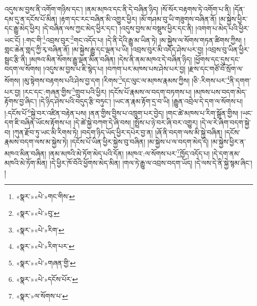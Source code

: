 འདུས་མ་བྱས་ནི་འགོག་གཉིས་དང་། །ནམ་མཁའ་དང་ནི་དེ་བཞིན་ཉིད། །སོ་སོར་བརྟགས་ཏེ་འགོག་པ་ནི། །དོན་དམ་དུ་ན་དངོས་པོ་མིན། །རྟག་དང་རང་བཞིན་མི་འགྱུར་ཕྱིར། །མོ་གཤམ་བུ་ཡི་གཟུགས་བཞིན་ནོ། །མ་སྐྱེས་ཕྱིར་དང་རྒྱུ་མེད་ཕྱིར། །དེ་བཞིན་ལས་ཀྱང་མེད་ཕྱིར་དང་། །འདུས་བྱས་མ་བསྡུས་ཕྱིར་དང་ནི། །འགག་པ་མེད་པའི་ཕྱིར་ཡང་ངོ། །:གང་གི་\footnote{«སྣར་»«པེ་»གང་གིས་}འབྲས་བུར་\footnote{«སྣར་»«པེ་»བུ་}གང་འདོད་པ། །དེ་ནི་དེའི་རྒྱུ་མ་ཡིན་ཏེ། །མ་སྐྱེས་ལ་སོགས་གཏན་ཚིགས་ཀྱིས། །གླང་ཆེན་གླད་ཀྱི་རྭ་བཞིན་ནོ། །མ་སྐྱེས་རྒྱུ་དང་ལྡན་པ་ཡི། །འབྲས་བུར་མི་འདོད་ཤེས་པར་བྱ། །འབྲས་བུ་ཡིན་ཕྱིར་སྦྲང་རྩི་ནི། །མཁའ་མིན་སོགས་རྒྱུ་ལྡན་མིན་བཞིན། །དེས་ནི་ནམ་མཁའ་དེ་བཞིན་ཉིད། །ཕྱོགས་དང་དུས་དང་བདག་ལ་སོགས། །འདུས་མ་བྱས་པ་ཇི་སྙེད་པ། །བཀག་པར་མཁས་པས་ཤེས་པར་བྱ། །རྫས་དང་གཙོ་བོ་སྲོག་ལ་སོགས། །མུ་སྟེགས་བརྟགས་པའི་ཤེས་བྱ་དག །རིགས་\footnote{«སྣར་»«པེ་»རིག་}དང་ལུང་ལ་མཁས་རྣམས་ཀྱིས། །ཅི་:རིགས་པར་\footnote{«སྣར་»«པེ་»རིག་པར་}ནི་དགག་པར་བྱ། །རང་དང་:གཞན་གྱིས་\footnote{«སྣར་»«པེ་»གཞན་གྱི་}གྲུབ་པའི་ཕྱིར། །དངོས་པོ་རྣམས་ལ་བདག་བཏགས་པ། །མཁས་པས་བདག་མེད་རྟོགས་བྱ་ཞིང་། །དེ་ཉིད་ཤེས་པའི་བདུད་རྩི་བཏུང་། །ཡང་ན་རྣམ་རྟོག་དྲ་བ་ཡི། །རྒྱུན་འབྲེལ་དེ་དག་ལ་སོགས་པ། །:དངོས་པོ་\footnote{«སྣར་»«པེ་»དངོས་པོར་}སྐྱེ་བར་འཛིན་བརྟེན་པས། །ནན་གྱིས་བྱིས་པ་འཁྲུག་པར་བྱེད། །གང་ཚེ་མཁས་པ་རིག་སྒྲོན་གྱིས། །ཡང་དག་ཇི་བཞིན་ཡོངས་རྟོགས་པ། །དེ་ཚེ་སྐྱེ་བཀག་དེ་ཞི་བས། །སྤྲོས་པ་ཉེ་བར་ཞི་བར་འགྱུར། །དེ་ལ་རེ་ཞིག་བདག་སྐྱེ་བ། །ཀུན་རྫོབ་ཏུ་ཡང་མི་རིགས་ཏེ། །བདག་ཉིད་ཡོད་ཕྱིར་དཔེར་བྱ་ན། །ཞོ་ནི་བདག་ལས་མི་སྐྱེ་བཞིན། །དངོས་རྣམས་བདག་ལས་མ་སྐྱེས་ཏེ། །དངོས་པོ་ཡིན་ཕྱིར་སྐྱེས་བུ་བཞིན། །མ་སྐྱེས་པ་ལ་བདག་མེད་དེ། །མ་སྐྱེས་ཕྱིར་ན་མཁའ་མིན་བཞིན། །ནམ་མཁའི་མེ་ཏོག་མེད་པའི་དོན། །མཁའ་:ལ་སོགས་པར་\footnote{«སྣར་»ལ་སོགས་པ་}ཁྱོད་འདོད་པ། །དེ་དག་ནམ་མཁའི་མེ་ཏོག་མིན། །དེ་ཕྱིར་ཁོ་བོའི་ཕྱོགས་མེད་མིན། །གལ་ཏེ་རྒྱུ་ལ་འབྲས་བདག་ཡོད། །དེ་ལས་དེ་ནི་སྐྱེ་སྙམ་ཞིང་། །
